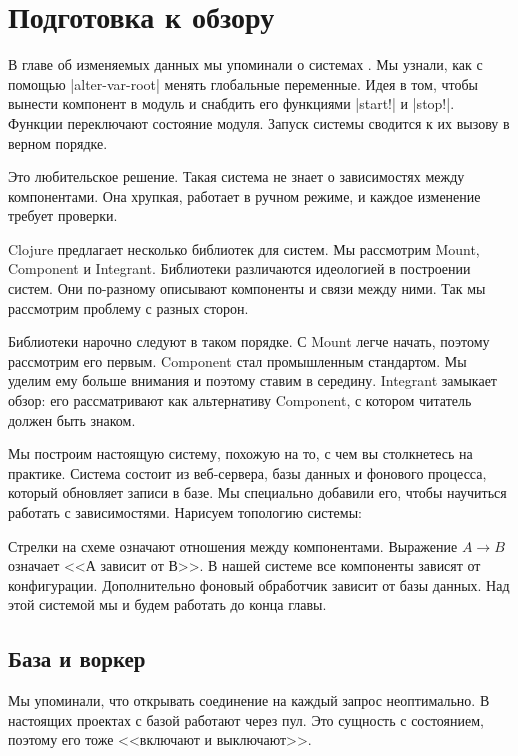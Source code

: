 \section{Подготовка к обзору}

В главе об изменяемых данных мы упоминали о системах . Мы
узнали, как с помощью \spverb|alter-var-root| менять глобальные переменные. Идея
в том, чтобы вынести компонент в модуль и снабдить его функциями \spverb|start!|
и \spverb|stop!|. Функции переключают состояние модуля. Запуск системы сводится
к их вызову в верном порядке.

Это любительское решение. Такая система не знает о зависимостях между
компонентами. Она хрупкая, работает в ручном режиме, и каждое изменение требует
проверки.

Clojure предлагает несколько библиотек для систем. Мы рассмотрим Mount,
Component и Integrant. Библиотеки различаются идеологией в построении
систем. Они по-разному описывают компоненты и связи между ними. Так мы
рассмотрим проблему с разных сторон.

Библиотеки нарочно следуют в таком порядке. С Mount легче начать, поэтому
рассмотрим его первым. Component стал промышленным стандартом. Мы уделим ему
больше внимания и поэтому ставим в середину. Integrant замыкает обзор: его
рассматривают как альтернативу Component, с котором читатель должен быть знаком.

Мы построим настоящую систему, похожую на то, с чем вы столкнетесь на
практике. Система состоит из веб-сервера, базы данных и фонового процесса,
который обновляет записи в базе. Мы специально добавили его, чтобы научиться
работать с зависимостями. Нарисуем топологию системы:


Стрелки на схеме означают отношения между компонентами. Выражение $A \to B$
означает <<А зависит от В>>. В нашей системе все компоненты зависят от
конфигурации. Дополнительно фоновый обработчик зависит от базы данных. Над этой
системой мы и будем работать до конца главы.

\subsection{База и воркер}

Мы упоминали, что открывать соединение на каждый запрос неоптимально. В
настоящих проектах с базой работают через пул. Это сущность с состоянием,
поэтому его тоже <<включают и выключают>>.

